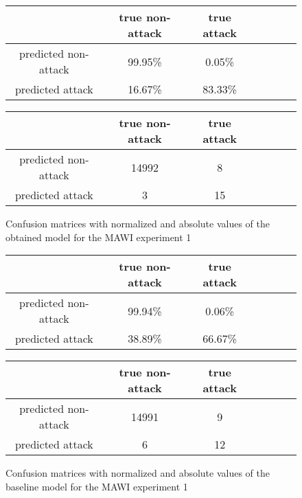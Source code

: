 \documentclass{article}
\begin{document}
\begin{figure}[h!]
    \centering
    \begin{tabular}{ |c|c|c|c|c|c|c| }
     \hline
      & true non-attack & true attack \\
     \hline
     predicted non-attack & 99.95\% & 0.05\% \\
     \hline
     predicted attack & 16.67\% & 83.33\% \\
     \hline
    \end{tabular}

    \vspace{0.2cm}

    \centering
    \begin{tabular}{ |c|c|c|c|c|c|c| }
     \hline
      & true non-attack & true attack \\
     \hline
     predicted non-attack & 14992 & 8 \\
     \hline
     predicted attack & 3 & 15 \\
     \hline
    \end{tabular}
    \caption{Confusion matrices with normalized and absolute values of the obtained model for the MAWI experiment 1}
    \label{fig-mawi-exp1-transcriptions}
\end{figure}


\begin{figure}[h!]
    \centering
    \begin{tabular}{ |c|c|c|c|c|c|c| }
     \hline
      & true non-attack & true attack \\
     \hline
     predicted non-attack & 99.94\% & 0.06\% \\
     \hline
     predicted attack & 38.89\% & 66.67\% \\
     \hline
    \end{tabular}

    \vspace{0.2cm}

    \centering
    \begin{tabular}{ |c|c|c|c|c|c|c| }
     \hline
      & true non-attack & true attack \\
     \hline
     predicted non-attack & 14991 & 9 \\
     \hline
     predicted attack & 6 & 12 \\
     \hline
    \end{tabular}
    \caption{Confusion matrices with normalized and absolute values of the baseline model for the MAWI experiment 1}
    \label{fig-mawi-exp1-baseline}
\end{figure}
\end{document}
